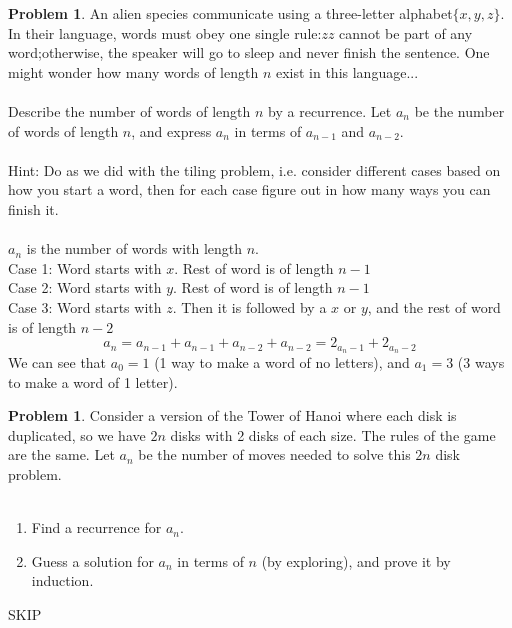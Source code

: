 \documentclass[10pt,leqno ]{article}
\theoremstyle{definition}
\newtheorem{problem}[theorem]{Problem}
\begin{document}
\begin{problem} An  alien  species  communicate  using  a  three-letter  alphabet$\{x,y,z\}$.   In  their language,  words  must  obey  one  single  rule:$zz$ cannot  be  part  of  any  word;otherwise, the speaker will go to sleep and never finish the sentence.  One might wonder how many words of length $n$ exist in this language...
\\\\
Describe the number of words of length $n$ by a recurrence.  Let $a_n$ 
be the number of words of length $n$, and express $a_n$ in terms of $a_{n-1}$ and $a_{n-2}$.
\\\\
Hint:  Do as we did with the tiling problem, i.e.  consider different cases based on how you start a word, then for each case figure out in how many ways you can finish it.
\\\\
\Large
$a_n$ is the number of words with length $n$.\\
Case 1: Word starts with $x$.  Rest of word is of length $n-1$\\
Case 2: Word starts with $y$.  Rest of word is of length $n-1$\\
Case 3: Word starts with $z$.  Then it is followed by a $x$ or $y$, and the rest of word is of length $n-2$\\
$$a_n = a_{n-1} + a_{n-1} + a_{n-2} + a_{n-2} = 2_{a_n - 1} + 2_{a_n - 2}$$
We can see that $a_0 = 1$ (1 way to make a word of no letters), and $a_1 = 3$ (3 ways to make a word of 1 letter).
\end{problem}
\newpage

\begin{problem} Consider a version of the Tower of Hanoi where each disk is duplicated, so we have $2n$ disks with 2 disks of each size.  The rules of the game are the same.  Let $a_n$ be the number of moves needed to solve this $2n$ disk problem.
\\\\
\begin{enumerate}
\item Find a recurrence for $a_n$.
\item Guess a solution for $a_n$ in terms of $n$ (by exploring), and prove it by induction.
\end{enumerate}
\Large
SKIP
\end{problem}
\newpage
\end{document}
